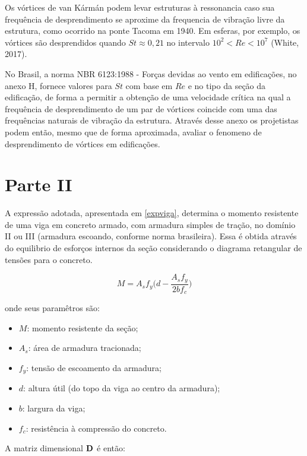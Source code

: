Os vórtices de van Kármán podem levar estruturas à ressonancia caso sua
frequência de desprendimento se aproxime da frequencia de vibração livre
da estrutura, como ocorrido na ponte Tacoma em 1940. Em esferas, por
exemplo, os vórtices são desprendidos quando \(St \approx 0,21\) no
intervalo \(10^2<Re<10^7\) (White, 2017).

No Brasil, a norma NBR 6123:1988 - Forças devidas ao vento em
edificações, no anexo H, fornece valores para \(St\) com base em \(Re\)
e no tipo da seção da edificação, de forma a permitir a obtenção de uma
velocidade crítica na qual a frequência de desprendimento de um par de
vórtices coincide com uma das frequências naturais de vibração da
estrutura. Através desse anexo os projetistas podem então, mesmo que de
forma aproximada, avaliar o fenomeno de desprendimento de vórtices em
edificações.

    \hypertarget{parte-ii}{%
\section{Parte II}\label{parte-ii}}

    A expressão adotada, apresentada em \ref{expviga}, determina o momento
resistente de uma viga em concreto armado, com armadura simples de
tração, no domínio II ou III (armadura escoando, conforme norma
brasileira). Essa é obtida através do equilibrio de esforços internos da
seção considerando o diagrama retangular de tensões para o concreto.

\begin{equation}
M = A_s f_y \Bigg( d - \frac{A_s f_y}{2 b f_c}\Bigg)
\label{expviga}
\end{equation}

onde seus paramêtros são:

\begin{itemize}
\tightlist
\item
  \(M\): momento resistente da seção;
\item
  \(A_s\): área de armadura tracionada;
\item
  \(f_y\): tensão de escoamento da armadura;
\item
  \(d\): altura útil (do topo da viga ao centro da armadura);
\item
  \(b\): largura da viga;
\item
  \(f_c\): resistência à compressão do concreto.
\end{itemize}

    A matriz dimensional \(\bf{D}\) é então:

